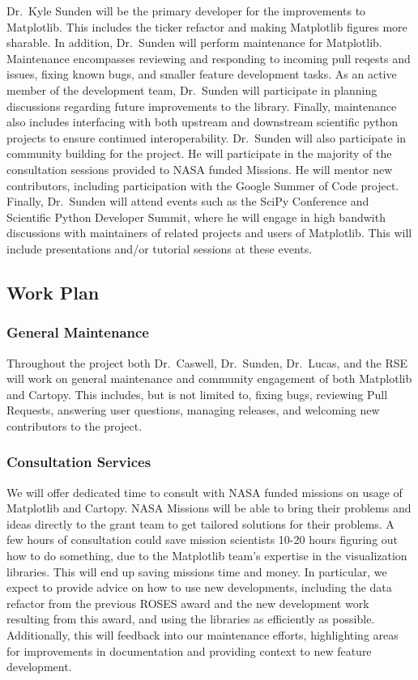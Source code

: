 \documentclass[12pt]{article}
\numberwithin{page}{section}
\begin{document}
Dr.\ Kyle Sunden will be the primary developer for the improvements to Matplotlib.
This includes the ticker refactor and making Matplotlib figures more sharable.
In addition, Dr.\ Sunden will perform maintenance for Matplotlib.
Maintenance encompasses reviewing and responding to incoming pull reqests and issues, fixing known bugs, and smaller feature development tasks.
As an active member of the development team, Dr.\ Sunden will participate in planning discussions regarding future improvements to the library.
Finally, maintenance also includes interfacing with both upstream and downstream scientific python projects to ensure continued interoperability.
Dr.\ Sunden will also participate in community building for the project.
He will participate in the majority of the consultation sessions provided to NASA funded Missions.
He will mentor new contributors, including participation with the Google Summer of Code project.
Finally, Dr.\ Sunden will attend events such as the SciPy Conference and Scientific Python Developer Summit, where he will engage in high bandwith discussions with maintainers of related projects and users of Matplotlib.
This will include presentations and/or tutorial sessions at these events.

\subsection{Work Plan}


\subsubsection{General Maintenance}

Throughout the project both Dr.\ Caswell, Dr.\ Sunden, Dr.\ Lucas, and the RSE
will work on general maintenance and community engagement of both Matplotlib
and Cartopy.  This includes, but is not limited to, fixing bugs, reviewing Pull
Requests, answering user questions, managing releases, and welcoming new
contributors to the project.

\subsubsection{Consultation Services}

We will offer dedicated time to consult with NASA funded missions on usage of Matplotlib and Cartopy.
NASA Missions will be able to bring their problems and ideas directly to the grant team to get tailored solutions for their problems.
A few hours of consultation could save mission scientists 10-20 hours figuring out how to do something, due to the Matplotlib team's expertise in the visualization libraries.
This will end up saving missions time and money.
In particular, we expect to provide advice on how to use new developments, including the data refactor from the previous ROSES award and the new development work resulting from this award, and using the libraries as efficiently as possible.
Additionally, this will feedback into our maintenance efforts, highlighting areas for improvements in documentation and providing context to new feature development.
\end{document}
